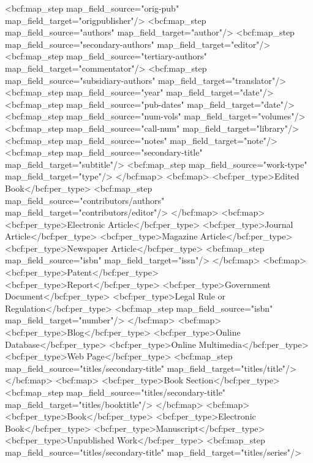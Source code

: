         <bcf:map_step map_field_source="orig-pub" map_field_target="origpublisher"/>
        <bcf:map_step map_field_source="authors" map_field_target="author"/>
        <bcf:map_step map_field_source="secondary-authors" map_field_target="editor"/>
        <bcf:map_step map_field_source="tertiary-authors" map_field_target="commentator"/>
        <bcf:map_step map_field_source="subsidiary-authors" map_field_target="translator"/>
        <bcf:map_step map_field_source="year" map_field_target="date"/>
        <bcf:map_step map_field_source="pub-dates" map_field_target="date"/>
        <bcf:map_step map_field_source="num-vols" map_field_target="volumes"/>
        <bcf:map_step map_field_source="call-num" map_field_target="library"/>
        <bcf:map_step map_field_source="notes" map_field_target="note"/>
        <bcf:map_step map_field_source="secondary-title" map_field_target="subtitle"/>
        <bcf:map_step map_field_source="work-type" map_field_target="type"/>
      </bcf:map>
      <bcf:map>
        <bcf:per_type>Edited Book</bcf:per_type>
        <bcf:map_step map_field_source="contributors/authors" map_field_target="contributors/editor"/>
      </bcf:map>
      <bcf:map>
        <bcf:per_type>Electronic Article</bcf:per_type>
        <bcf:per_type>Journal Article</bcf:per_type>
        <bcf:per_type>Magazine Article</bcf:per_type>
        <bcf:per_type>Newspaper Article</bcf:per_type>
        <bcf:map_step map_field_source="isbn" map_field_target="issn"/>
      </bcf:map>
      <bcf:map>
        <bcf:per_type>Patent</bcf:per_type>
        <bcf:per_type>Report</bcf:per_type>
        <bcf:per_type>Government Document</bcf:per_type>
        <bcf:per_type>Legal Rule or Regulation</bcf:per_type>
        <bcf:map_step map_field_source="isbn" map_field_target="number"/>
      </bcf:map>
      <bcf:map>
        <bcf:per_type>Blog</bcf:per_type>
        <bcf:per_type>Online Database</bcf:per_type>
        <bcf:per_type>Online Multimedia</bcf:per_type>
        <bcf:per_type>Web Page</bcf:per_type>
        <bcf:map_step map_field_source="titles/secondary-title" map_field_target="titles/title"/>
      </bcf:map>
      <bcf:map>
        <bcf:per_type>Book Section</bcf:per_type>
        <bcf:map_step map_field_source="titles/secondary-title" map_field_target="titles/booktitle"/>
      </bcf:map>
      <bcf:map>
        <bcf:per_type>Book</bcf:per_type>
        <bcf:per_type>Electronic Book</bcf:per_type>
        <bcf:per_type>Manuscript</bcf:per_type>
        <bcf:per_type>Unpublished Work</bcf:per_type>
        <bcf:map_step map_field_source="titles/secondary-title" map_field_target="titles/series"/>
